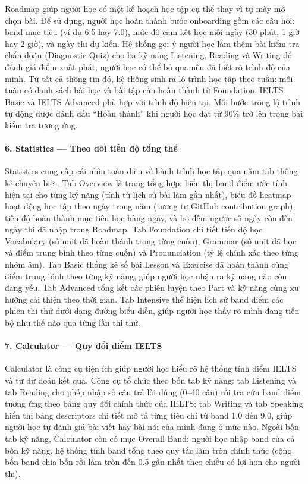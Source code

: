 Roadmap giúp người học có một kế hoạch học tập cụ thể thay vì tự mày mò chọn bài. Để sử dụng, người học hoàn thành bước onboarding gồm các câu hỏi: band mục tiêu (ví dụ 6.5 hay 7.0), mức độ cam kết học mỗi ngày (30 phút, 1 giờ hay 2 giờ), và ngày thi dự kiến. Hệ thống gợi ý người học làm thêm bài kiểm tra chẩn đoán (Diagnostic Quiz) cho ba kỹ năng Listening, Reading và Writing để đánh giá điểm xuất phát; người học có thể bỏ qua nếu đã biết rõ trình độ của mình. Từ tất cả thông tin đó, hệ thống sinh ra lộ trình học tập theo tuần: mỗi tuần có danh sách bài học và bài tập cần hoàn thành từ Foundation, IELTS Basic và IELTS Advanced phù hợp với trình độ hiện tại. Mỗi bước trong lộ trình tự động được đánh dấu ``Hoàn thành'' khi người học đạt từ 90\% trở lên trong bài kiểm tra tương ứng.

\paragraph{6. Statistics --- Theo dõi tiến độ tổng thể}

Statistics cung cấp cái nhìn toàn diện về hành trình học tập qua năm tab thống kê chuyên biệt. Tab Overview là trang tổng hợp: hiển thị band điểm ước tính hiện tại cho từng kỹ năng (tính từ lịch sử bài làm gần nhất), biểu đồ heatmap hoạt động học tập theo ngày trong năm (tương tự GitHub contribution graph), tiến độ hoàn thành mục tiêu học hàng ngày, và bộ đếm ngược số ngày còn đến ngày thi đã nhập trong Roadmap. Tab Foundation chi tiết tiến độ học Vocabulary (số unit đã hoàn thành trong từng cuốn), Grammar (số unit đã học và điểm trung bình theo từng cuốn) và Pronunciation (tỷ lệ chính xác theo từng nhóm âm). Tab Basic thống kê số bài Lesson và Exercise đã hoàn thành cùng điểm trung bình theo từng kỹ năng, giúp người học nhận ra kỹ năng nào còn đang yếu. Tab Advanced tổng kết các phiên luyện theo Part và kỹ năng cùng xu hướng cải thiện theo thời gian. Tab Intensive thể hiện lịch sử band điểm các phiên thi thử dưới dạng đường biểu diễn, giúp người học thấy rõ mình đang tiến bộ như thế nào qua từng lần thi thử.

\paragraph{7. Calculator --- Quy đổi điểm IELTS}

Calculator là công cụ tiện ích giúp người học hiểu rõ hệ thống tính điểm IELTS và tự dự đoán kết quả. Công cụ tổ chức theo bốn tab kỹ năng: tab Listening và tab Reading cho phép nhập số câu trả lời đúng (0--40 câu) rồi tra cứu band điểm tương ứng theo bảng quy đổi chính thức của IELTS; tab Writing và tab Speaking hiển thị bảng descriptors chi tiết mô tả từng tiêu chí từ band 1.0 đến 9.0, giúp người học tự đánh giá bài viết hay bài nói của mình đang ở mức nào. Ngoài bốn tab kỹ năng, Calculator còn có mục Overall Band: người học nhập band của cả bốn kỹ năng, hệ thống tính band tổng theo quy tắc làm tròn chính thức (cộng bốn band chia bốn rồi làm tròn đến 0.5 gần nhất theo chiều có lợi hơn cho người thi).

